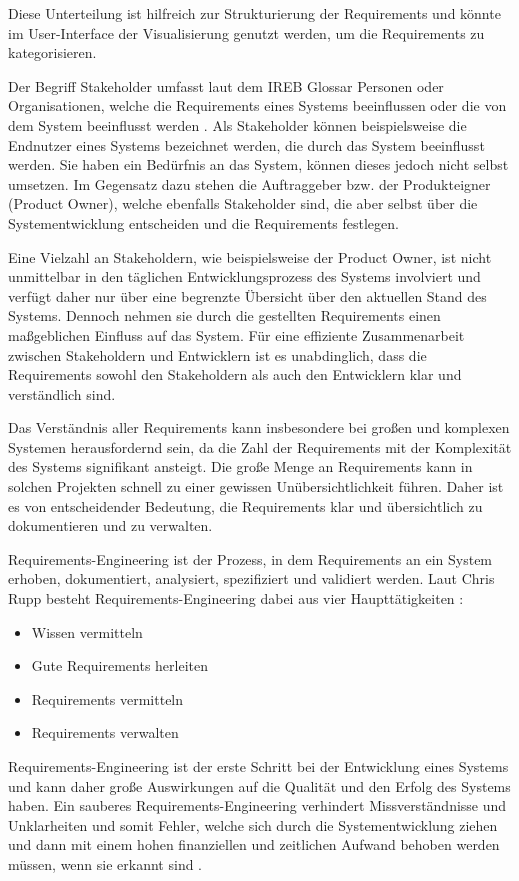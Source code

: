     Diese Unterteilung ist hilfreich zur Strukturierung der Requirements und könnte im User-Interface der Visualisierung genutzt werden, um die Requirements zu kategorisieren.
    

    Der Begriff Stakeholder umfasst laut dem IREB Glossar \glqq{}Personen oder Organisationen, welche die Requirements eines Systems beeinflussen oder die von dem System beeinflusst werden\grqq{} \autocite[][]{ireb_cpre_glossary}.
    Als Stakeholder können beispielsweise die Endnutzer eines Systems bezeichnet werden, die durch das System beeinflusst werden.
    Sie haben ein Bedürfnis an das System, können dieses jedoch nicht selbst umsetzen.
    Im Gegensatz dazu stehen die Auftraggeber bzw. der Produkteigner (Product Owner), welche ebenfalls Stakeholder sind, die aber selbst über die Systementwicklung entscheiden und die Requirements festlegen.

    Eine Vielzahl an Stakeholdern, wie beispielsweise der Product Owner, ist nicht unmittelbar in den täglichen Entwicklungsprozess des Systems involviert und verfügt daher nur über eine begrenzte Übersicht über den aktuellen Stand des Systems.
    Dennoch nehmen sie durch die gestellten Requirements einen maßgeblichen Einfluss auf das System.
    Für eine effiziente Zusammenarbeit zwischen Stakeholdern und Entwicklern ist es unabdinglich, dass die Requirements sowohl den Stakeholdern als auch den Entwicklern klar und verständlich sind.

    Das Verständnis aller Requirements kann insbesondere bei großen und komplexen Systemen herausfordernd sein, da die Zahl der Requirements mit der Komplexität des Systems signifikant ansteigt.
    Die große Menge an Requirements kann in solchen Projekten schnell zu einer gewissen Unübersichtlichkeit führen.
    Daher ist es von entscheidender Bedeutung, die Requirements klar und übersichtlich zu dokumentieren und zu verwalten.


    Requirements-Engineering ist der Prozess, in dem Requirements an ein System erhoben, dokumentiert, analysiert, spezifiziert und validiert werden.
    Laut Chris Rupp besteht Requirements-Engineering dabei aus vier Haupttätigkeiten \autocite[][S.20]{Rupp2014}:
    \begin{itemize}
        \item Wissen vermitteln
        \item Gute Requirements herleiten
        \item Requirements vermitteln
        \item Requirements verwalten
    \end{itemize}
    Requirements-Engineering ist der erste Schritt bei der Entwicklung eines Systems und kann daher große Auswirkungen auf die Qualität und den Erfolg des Systems haben.
    Ein sauberes Requirements-Engineering verhindert Missverständnisse und Unklarheiten und somit Fehler, welche sich durch die Systementwicklung ziehen und dann mit einem hohen finanziellen und zeitlichen Aufwand behoben werden müssen, wenn sie erkannt sind \autocite[][S.20]{Rupp2014}.

